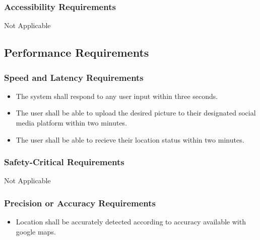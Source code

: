 \documentclass[]{article}
\begin{document}
\subsubsection{Accessibility Requirements}
\label{ssub:accessibility_requirements}
	Not Applicable


\subsection{Performance Requirements}
\label{sub:performance_requirements}

\subsubsection{Speed and Latency Requirements}
\label{ssub:speed_and_latency_requirements}
\begin{itemize}
	\item The system shall respond to any user input within three seconds.
	\item The user shall be able to upload the desired picture to their designated social media platform within two minutes.
	\item The user shall be able to recieve their location status within two minutes.
\end{itemize}

\subsubsection{Safety-Critical Requirements}
\label{ssub:safety_critical_requirements}
Not Applicable

\subsubsection{Precision or Accuracy Requirements}
\label{ssub:precision_or_accuracy_requirements}
\begin{itemize}
	\item Location shall be accurately detected according to accuracy available with google maps.
\end{itemize}
\end{document}

